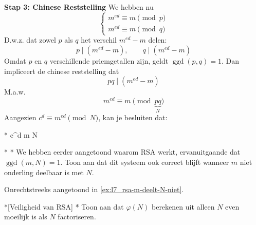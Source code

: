 \textbf{Stap 3: Chinese Reststelling}\newline
We hebben nu
\begin{equation*}
    \begin{cases}
        m^{ed} \equiv m \pmod p \\
        m^{ed} \equiv m \pmod q 
    \end{cases}
\end{equation*}
D.w.z. dat zowel $p$ als $q$ het verschil $m^{ed} - m$ delen:
\begin{equation*}
    p \mid \left(m^{ed} - m\right), \qquad q \mid \left(m^{ed} - m\right)
\end{equation*}
Omdat $p$ en $q$ verschillende priemgetallen zijn, geldt $\operatorname{ggd}(p, q) = 1$. Dan impliceert de chinese reststelling dat
\begin{equation*}
    pq \mid \left(m^{ed} - m\right)
\end{equation*}
M.a.w.
\begin{equation*}
    m^{ed} \equiv m \pmod {\underbrace{pq}_N}
\end{equation*}
Aangezien $c^d \equiv m^{ed} \pmod N$, kan je besluiten dat:
\begin{equationbox}*
    c^d \equiv m \pmod N
\end{equationbox}

\begin{niceexercise}*\label{ex:l7_rsa-m-deelt-N-niet}
    \nextpart[]*
    We hebben eerder aangetoond waarom RSA werkt, ervanuitgaande dat $\operatorname{ggd}(m,N) = 1$. Toon aan dat dit systeem ook correct blijft wanneer $m$ niet onderling deelbaar is met $N$.
\end{niceexercise}

Onrechtstreeks aangetoond in \cref{ex:l7_rsa-m-deelt-N-niet}.

\begin{niceexercise}*[Veiligheid van RSA]\label{ex:l7_rsa-veiligheid}
    \nextpart[]*
    Toon aan dat $\varphi(N)$ berekenen uit alleen $N$ even moeilijk is als $N$ factoriseren.
\end{niceexercise}

